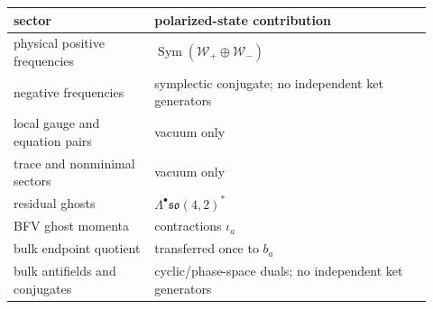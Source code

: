 \begin{tabular}{p{0.31\linewidth}|p{0.61\linewidth}}
sector & polarized-state contribution \\
\hline
physical positive frequencies & $\operatorname{Sym}(\mathcal W_+\oplus\mathcal W_-)$ \\
negative frequencies & symplectic conjugate; no independent ket generators \\
local gauge and equation pairs & vacuum only \\
trace and nonminimal sectors & vacuum only \\
residual ghosts & $\Lambda^\bullet\mathfrak{so}(4,2)^*$ \\
BFV ghost momenta & contractions $\iota_a$ \\
bulk endpoint quotient & transferred once to $b_a$ \\
bulk antifields and conjugates & cyclic/phase-space duals; no independent ket generators \\
\end{tabular}

